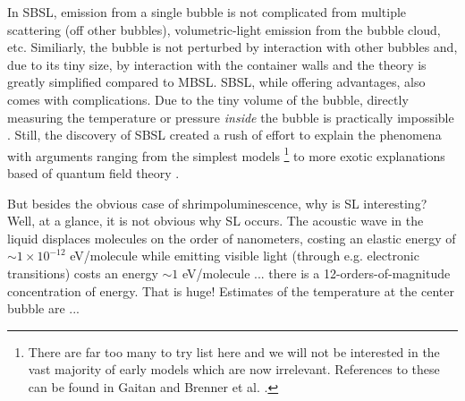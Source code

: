 \documentclass[rmp,aps,nofootinbib,superscriptaddress,floatfix]{revtex4-2}
\begin{document}
In SBSL, emission from a single bubble is not complicated from multiple scattering (off other bubbles), volumetric-light emission from the bubble cloud, etc. Similiarly, the bubble is not perturbed by interaction with other bubbles and, due to its tiny size, by interaction with the container walls and the theory is greatly simplified compared to MBSL. SBSL, while offering advantages, also comes with complications. Due to the tiny volume of the bubble, directly measuring the temperature or pressure \emph{inside} the bubble is practically impossible \cite{suslick2008inside}. Still, the discovery of SBSL created a rush of effort to explain the phenomena with arguments ranging from the simplest models \footnote{There are far too many to try list here and we will not be interested in the vast majority of early models which are now irrelevant. References to these can be found in Gaitan \cite{gaitan1990experimental} and Brenner et al. \cite{brenner2002single}.} to more exotic explanations based of quantum field theory \cite{schwinger1993casimir,eberlein1996sonoluminescence,liberati2000sonoluminescence}.

But besides the obvious case of shrimpoluminescence, why is SL interesting? Well, at a glance, it is not obvious why SL occurs. The acoustic wave in the liquid displaces molecules on the order of nanometers, costing an elastic energy of  $\sim1\times 10^{-12}$ eV/molecule while emitting visible light (through e.g. electronic transitions) costs an energy $\sim1$ eV/molecule \cite{lohse2018bubble,crum1994sonoluminescence}... there is a 12-orders-of-magnitude concentration of energy. That is huge! Estimates of the temperature at the center bubble are ...




\end{document}
